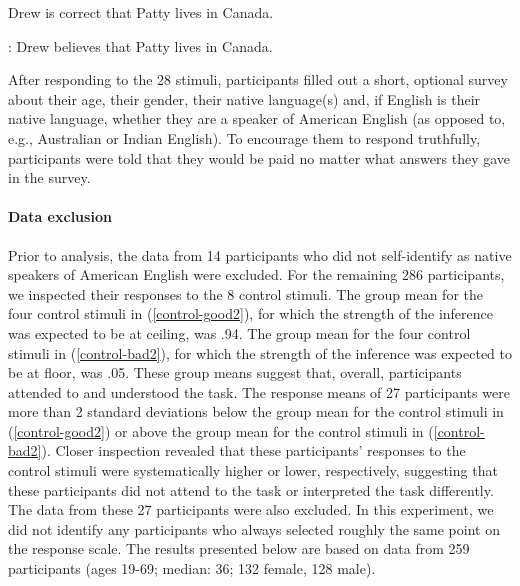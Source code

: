 \documentclass[11pt,fleqn]{article}
\newcommand{\6}{\mbox{$[\hspace*{-.6mm}[$}}
\newcommand{\9}{\mbox{$]\hspace*{-.6mm}]$}}
\begin{document}
\begin{exe}
\ex\label{train2}
\begin{xlist}
 Drew is correct that Patty lives in Canada. 

: Drew believes that Patty lives in Canada.
\end{xlist}
\end{exe}

After responding to the 28 stimuli, participants filled out a short, optional survey about their age, their gender, their native language(s) and, if English is their native language, whether they are a speaker of American English (as opposed to, e.g., Australian or Indian English). To encourage them to respond truthfully, participants were told that they would be paid no matter what answers they gave in the survey.

\paragraph{Data exclusion}

Prior to analysis, the data from 14 participants who did not self-identify as native speakers of American English were excluded. For the remaining 286 participants, we inspected their responses to the 8 control stimuli. The group mean for the four control stimuli in (\ref{control-good2}), for which the strength of the inference was expected to be at ceiling, was .94. The group mean for the four control stimuli in (\ref{control-bad2}), for which the strength of the inference was expected to be at floor, was .05. These group means suggest that, overall, participants attended to and understood the task. The response means of 27 participants were more than 2 standard deviations below the group mean for the control stimuli in (\ref{control-good2}) or above the group mean for the control stimuli in (\ref{control-bad2}). Closer inspection revealed that these participants' responses to the control stimuli were systematically higher or lower, respectively, suggesting that these participants did not attend to the task or interpreted the task differently. The data from these 27 participants were also excluded. In this experiment, we did not identify any participants who always selected roughly the same point on the response scale. The results presented below are based on data from 259 participants (ages 19-69; median: 36; 132 female, 128 male). %
\end{document}
